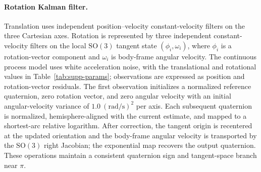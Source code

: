 \documentclass[review]{vgtc}
\begin{document}
\paragraph{Rotation Kalman filter.}
Translation uses independent position--velocity constant-velocity filters on the
three Cartesian axes. Rotation is represented by three independent constant-velocity
filters on the local $\mathrm{SO}(3)$ tangent state $(\phi_i,\omega_i)$, where
$\phi_i$ is a rotation-vector component and $\omega_i$ is body-frame angular
velocity. The continuous process model uses white acceleration noise, with the
translational and rotational values in Table~\ref{tab:supp-params}; observations
are expressed as position and rotation-vector residuals. The first observation
initializes a normalized reference quaternion, zero rotation vector, and zero angular
velocity with an initial angular-velocity variance of $1.0~(\mathrm{rad}/\mathrm{s})^2$
per axis. Each subsequent quaternion is normalized, hemisphere-aligned with the
current estimate, and mapped to a shortest-arc relative logarithm. After correction,
the tangent origin is recentered at the updated orientation and the body-frame angular
velocity is transported by the $\mathrm{SO}(3)$ right Jacobian; the exponential map
recovers the output quaternion. These operations maintain a consistent quaternion
sign and tangent-space branch near $\pi$.
\end{document}
